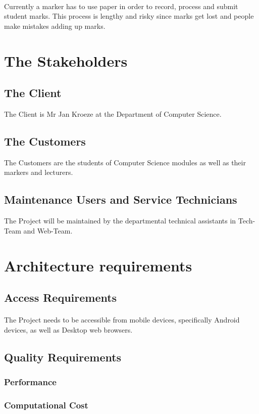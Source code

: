 \documentclass[12pt,a4paper]{article}
\begin{document}
\paragraph{}
Currently a marker has to use paper in order to record, process and submit student marks. This process is lengthy and risky since marks get lost and people make mistakes adding up marks.
\section{The Stakeholders}
\subsection{The Client}
The Client is Mr Jan Kroeze at the Department of Computer Science.
\subsection{The Customers}
The Customers are the students of Computer Science modules as well as their markers and lecturers.
\subsection{Maintenance Users and Service Technicians}
The Project will be maintained by the departmental technical assistants in Tech-Team and Web-Team.
\section{Architecture requirements}
\subsection{Access Requirements}
\paragraph{}
The Project needs to be accessible from mobile devices, specifically Android devices, as well as Desktop web browsers.
\subsection{Quality Requirements}
\subsubsection{Performance}
\subsubsection{Computational Cost}
\end{document}
